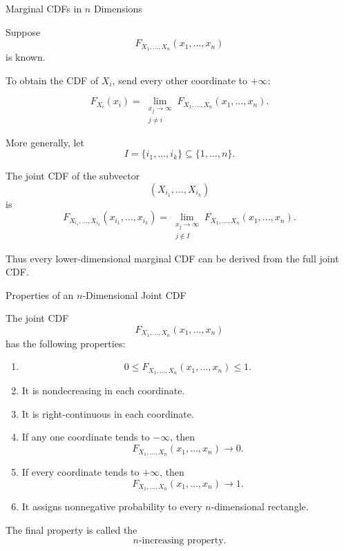 \begin{frame}{Marginal CDFs in \(n\) Dimensions}

Suppose
\[
F_{X_1,\dots,X_n}(x_1,\dots,x_n)
\]
is known.

To obtain the CDF of \(X_i\), send every other coordinate to
\(+\infty\):

\[
\boxed{
F_{X_i}(x_i)
=
\lim_{\substack{x_j\to\infty\\j\neq i}}
F_{X_1,\dots,X_n}(x_1,\dots,x_n).
}
\]

More generally, let
\[
I=\{i_1,\dots,i_k\}
\subseteq
\{1,\dots,n\}.
\]

The joint CDF of the subvector
\[
(X_{i_1},\dots,X_{i_k})
\]
is
\[
\boxed{
F_{X_{i_1},\dots,X_{i_k}}
(x_{i_1},\dots,x_{i_k})
=
\lim_{\substack{x_j\to\infty\\j\notin I}}
F_{X_1,\dots,X_n}(x_1,\dots,x_n).
}
\]

Thus every lower-dimensional marginal CDF can be derived from the
full joint CDF.

\end{frame}














\begin{frame}{Properties of an \(n\)-Dimensional Joint CDF}

The joint CDF
\[
F_{X_1,\dots,X_n}(x_1,\dots,x_n)
\]
has the following properties:

\begin{enumerate}
    \item
    \[
    0\le F_{X_1,\dots,X_n}(x_1,\dots,x_n)\le1.
    \]

    \item It is nondecreasing in each coordinate.

    \item It is right-continuous in each coordinate.

    \item If any one coordinate tends to \(-\infty\), then
    \[
    F_{X_1,\dots,X_n}(x_1,\dots,x_n)\longrightarrow0.
    \]

    \item If every coordinate tends to \(+\infty\), then
    \[
    F_{X_1,\dots,X_n}(x_1,\dots,x_n)\longrightarrow1.
    \]

    \item It assigns nonnegative probability to every
    \(n\)-dimensional rectangle.
\end{enumerate}

The final property is called the
\[
\boxed{\text{\(n\)-increasing property.}}
\]

\end{frame}




